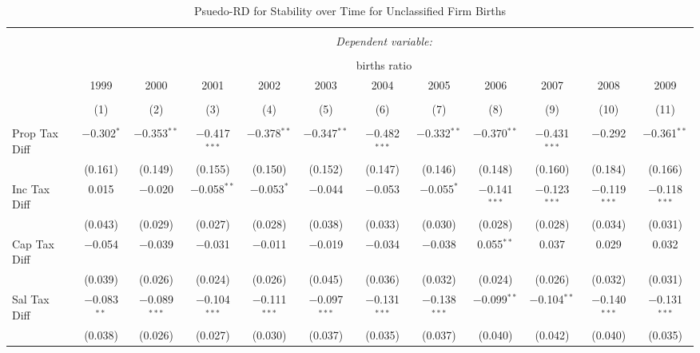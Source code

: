 
\begin{table}[!htbp] \centering 
  \caption{Psuedo-RD for Stability over Time for  Unclassified Firm Births} 
  \label{99year} 
\small 
\begin{tabular}{@{\extracolsep{5pt}}lccccccccccc} 
\\[-1.8ex]\hline 
\hline \\[-1.8ex] 
 & \multicolumn{11}{c}{\textit{Dependent variable:}} \\ 
\cline{2-12} 
\\[-1.8ex] & \multicolumn{11}{c}{births ratio} \\ 
 & 1999 & 2000 & 2001 & 2002 & 2003 & 2004 & 2005 & 2006 & 2007 & 2008 & 2009 \\ 
\\[-1.8ex] & (1) & (2) & (3) & (4) & (5) & (6) & (7) & (8) & (9) & (10) & (11)\\ 
\hline \\[-1.8ex] 
 Prop Tax Diff & $-$0.302$^{*}$ & $-$0.353$^{**}$ & $-$0.417$^{***}$ & $-$0.378$^{**}$ & $-$0.347$^{**}$ & $-$0.482$^{***}$ & $-$0.332$^{**}$ & $-$0.370$^{**}$ & $-$0.431$^{***}$ & $-$0.292 & $-$0.361$^{**}$ \\ 
  & (0.161) & (0.149) & (0.155) & (0.150) & (0.152) & (0.147) & (0.146) & (0.148) & (0.160) & (0.184) & (0.166) \\ 
  Inc Tax Diff & 0.015 & $-$0.020 & $-$0.058$^{**}$ & $-$0.053$^{*}$ & $-$0.044 & $-$0.053 & $-$0.055$^{*}$ & $-$0.141$^{***}$ & $-$0.123$^{***}$ & $-$0.119$^{***}$ & $-$0.118$^{***}$ \\ 
  & (0.043) & (0.029) & (0.027) & (0.028) & (0.038) & (0.033) & (0.030) & (0.028) & (0.028) & (0.034) & (0.031) \\ 
  Cap Tax Diff & $-$0.054 & $-$0.039 & $-$0.031 & $-$0.011 & $-$0.019 & $-$0.034 & $-$0.038 & 0.055$^{**}$ & 0.037 & 0.029 & 0.032 \\ 
  & (0.039) & (0.026) & (0.024) & (0.026) & (0.045) & (0.036) & (0.032) & (0.024) & (0.026) & (0.032) & (0.031) \\ 
  Sal Tax Diff & $-$0.083$^{**}$ & $-$0.089$^{***}$ & $-$0.104$^{***}$ & $-$0.111$^{***}$ & $-$0.097$^{***}$ & $-$0.131$^{***}$ & $-$0.138$^{***}$ & $-$0.099$^{**}$ & $-$0.104$^{**}$ & $-$0.140$^{***}$ & $-$0.131$^{***}$ \\ 
  & (0.038) & (0.026) & (0.027) & (0.030) & (0.037) & (0.035) & (0.037) & (0.040) & (0.042) & (0.040) & (0.035) \\ 

\end{tabular}
\end{table}
